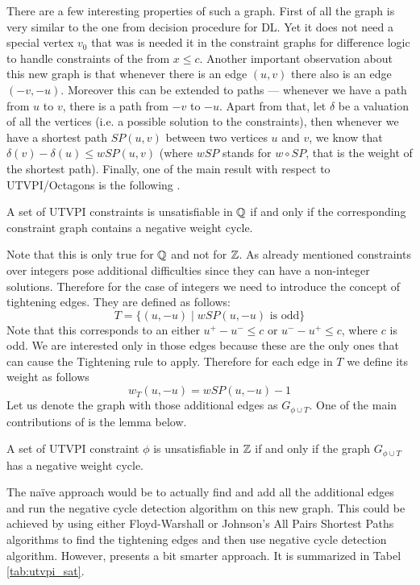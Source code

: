 There are a few interesting properties of such a graph. First of all the graph
is very similar to the one from decision procedure for DL. Yet it does not need
a special vertex $v_0$ that was is needed it in the constraint graphs for
difference logic to handle constraints of the from $x \leq c$. Another important
observation about this new graph is that whenever there is an edge $(u, v)$
there also is an edge $(-v, -u)$. Moreover this can be extended to paths ---
whenever we have a path from $u$ to $v$, there is a path from $-v$ to $-u$.
Apart from that, let $\delta$ be a valuation of all the vertices (i.e. a possible
solution to the constraints), then whenever we have a shortest path $SP(u, v)$ between
two vertices $u$ and $v$, we know that $\delta(v) - \delta(u) \leq wSP(u,
v)$ (where $wSP$ stands for $w \circ SP$, that is the weight of the shortest
path). Finally, one of the main result with respect to UTVPI/Octagons is the
following \cite{bib:octagons}.
%
\begin{lemma}
A set of UTVPI constraints is unsatisfiable in $\mathbb{Q}$ if and only if the
corresponding constraint graph contains a negative weight cycle.
\end{lemma}
%
Note that this is only true for $\mathbb{Q}$ and not for $\mathbb{Z}$. As already
mentioned constraints over integers pose additional difficulties since they can
have a non-integer solutions. Therefore for the case of integers we need to
introduce the concept of tightening edges. They are defined as follows:
\[
T = \{ (u, -u) \mid wSP(u, -u) \text{ is odd} \}
\]
Note that this corresponds to an either $u^+ - u^- \leq c$ or $u^- - u^+ \leq
c$, where $c$ is odd. We are interested only in those edges because these are the
only ones that can cause the Tightening rule to apply. Therefore for each edge
in $T$ we define its weight as follows
\[
w_T(u, -u) = wSP(u, -u) - 1
\]
Let us denote the graph with those additional edges as $G_{\phi \cup T}$. One of
the main contributions of \cite{bib:ms_utvpi} is the lemma below.
\begin{lemma}
A set of UTVPI constraint $\phi$ is unsatisfiable in $\mathbb{Z}$ if and only if
the graph $G_{\phi \cup T}$ has a negative weight cycle.
\end{lemma}
The na\"{i}ve approach would be to actually find and add all the additional
edges and run the negative cycle detection algorithm on this new graph. This
could be achieved by using either Floyd-Warshall or Johnson's All Pairs Shortest
Paths algorithms to find the tightening edges and then use negative cycle
detection algorithm. However, \cite{bib:ms_utvpi} presents a bit smarter
approach. It is summarized in Tabel \ref{tab:utvpi_sat}.


